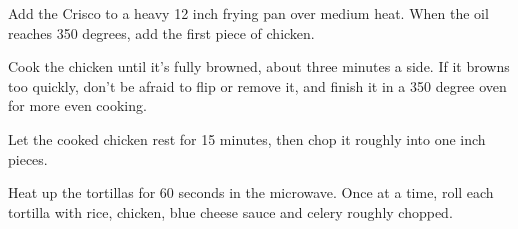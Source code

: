 \begin{recipe}
Add the Crisco to a heavy 12 inch frying pan over medium heat. When the oil reaches 350 degrees, add the first piece of chicken.

Cook the chicken until it's fully browned, about three minutes a side. If it browns too quickly, don't be afraid to flip or remove it, and finish it in a 350 degree oven for more even cooking.

Let the cooked chicken rest for 15 minutes, then chop it roughly into one inch pieces.


Heat up the tortillas for 60 seconds in the microwave. Once at a time, roll each tortilla with rice, chicken, blue cheese sauce and celery roughly chopped.

\end{recipe}
